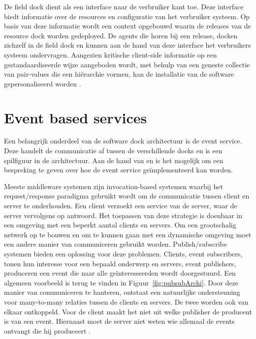 De field dock dient als een interface naar de verbruiker kant toe.
Deze interface biedt informatie over de resources en configuratie van het verbruiker systeem.
Op basis van deze informatie wordt een context opgebouwd waarin de releases van de resource dock worden gedeployed.
De agents die horen bij een release, docken zichzelf in de field dock en kunnen aan de hand van deze interface het verbruikers systeem ondervragen.
Aangezien kritische client-side informatie op een gestandaardiseerde wijze aangeboden wordt, met behulp van een geneste collectie van pair-values die een hiërarchie vormen, kan de installatie van de software gepersonaliseerd worden \citep{hall1999cooperative}.

\section{Event based services}\label{sec:event}
Een belangrijk onderdeel van de software dock architectuur is de event service.
Deze handelt de communicatie af tussen de verschillende docks en is een spilfiguur in de architectuur.
Aan de hand van \citet{pietzuch2002hermes} en \citet{carzaniga2001design} is het mogelijk om een bespreking te geven over hoe de event service geïmplementeerd kan worden.

Meeste middleware systemen zijn invocation-based systemen waarbij het request/response paradigma gebruikt wordt om de communicatie tussen client en server te onderhouden.
Een client verzoekt een service van de server, waar de server vervolgens op antwoord.
Het toepassen van deze strategie is doenbaar in een omgeving met een beperkt aantal clients en servers.
Om een grootschalig netwerk op te bouwen en om te kunnen gaan met een dynamische omgeving moet een andere manier van communiceren gebruikt worden.
Publish/subscribe systemen bieden een oplossing voor deze problemen.
Clients, event subscribers, tonen hun interesse voor een bepaald onderwerp en servers, event publishers, produceren een event die naar alle geïnteresseerden wordt doorgestuurd.
Een algemeen voorbeeld is terug te vinden in Figuur~\vref{fig:pubsubArchi}.
Door deze manier van communiceren te hanteren, ontstaat een natuurlijke ondersteuning voor many-to-many relaties tussen de clients en servers.
De twee worden ook van elkaar ontkoppeld.
Voor de client maakt het niet uit welke publisher de producent is van een event.
Hiernaast moet de server niet weten wie allemaal de events ontvangt die hij produceert \citep{pietzuch2002hermes}.

